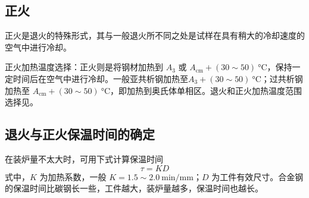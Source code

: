 \documentclass[a4paper,utf8]{article}
\begin{document}
    \subsection{正火}
        正火是退火的特殊形式，其与一般退火所不同之处是试样在具有稍大的冷却速度的空气中进行冷却。\par
        正火加热温度选择：正火则是将钢材加热到 $A_3$ 或 $A_{\textrm{cm}} + (30 \sim 50)~\unit{\degreeCelsius}$，保持一定时间后在空气中进行冷却。一般亚共析钢加热至$A_3 + (30 \sim 50)~\unit{\degreeCelsius}$；过共析钢加热至 $A_{\textrm{cm}} + (30 \sim 50)~\unit{\degreeCelsius}$，即加热到奥氏体单相区。退火和正火加热温度范围选择见。
        \begin{figure}[!ht]
        \begin{floatrow}\centering
        \end{floatrow}
        \end{figure}
    \subsection{退火与正火保温时间的确定}
        在装炉量不太大时，可用下式计算保温时间
        \begin{equation}
            \tau = K D \label{equ:1}
        \end{equation}
        式中，$K$ 为加热系数，一般 $K=1.5 \sim \SI{2.0}{\minute/\milli\metre}$；$D$ 为工件有效尺寸。合金钢的保温时间比碳钢长一些，工件越大，装炉量越多，保温时间也越长。
\end{document}
